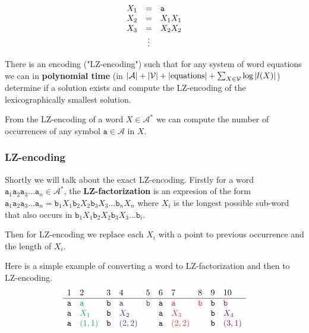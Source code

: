 $$
\begin{array}{r c l}
	X_1 &=& \mathtt{a} \\
	X_2 &=& X_1 X_1 \\
	X_3 &=& X_2 X_2 \\
	&\vdots&
\end{array}
$$

\begin{fact}
	There is an encoding ("LZ-encoding") such that for any system of word equations we can in \textbf{polynomial time} (in $\left|{\mathcal{A}}\right| + \left|{\mathcal{V}}\right| + \left|{\text{equations}}\right| + \sum_{X \in \mathcal{V}} \log |l(X)|$) determine if a solution exists and compute the LZ-encoding of the lexicographically smallest solution.
\end{fact}

\begin{fact}
	From the LZ-encoding of a word $X \in \mathcal{A}^{\ast}$ we can compute the number of occurrences of any symbol $\mathtt{a} \in \mathcal{A}$ in $X$.
\end{fact}

\subsubsection{LZ-encoding}

Shortly we will talk about the exact LZ-encoding. Firstly for a word $\mathtt{a}_1 \mathtt{a}_2 \mathtt{a}_3 \dots \mathtt{a}_n \in \mathcal{A}^\ast$, the \textbf{LZ-factorization} is an expresion of the form $\mathtt{a}_1 \mathtt{a}_2 \mathtt{a}_3 \dots \mathtt{a}_{n} = \mathtt{b}_1 X_1 \mathtt{b}_2 X_2 \mathtt{b}_3 X_3 \dots \mathtt{b}_n X_n$ where $X_i$ is the longest possible sub-word that also occurs in $\mathtt{b}_1 X_1 \mathtt{b}_2 X_2 \mathtt{b}_3 X_3 \dots \mathtt{b}_i$.

Then for LZ-encoding we replace each $X_i$ with a point to previous occurrence and the length of $X_i$.

\begin{example}
	Here is a simple example of converting a word to LZ-factorization and then to LZ-encoding.
	$$
	\begin{array}{l l l l l l l l l l}
		1 & 2 & 3 & 4 & 5 & 6 & 7 & 8 & 9 & 10 \\
		\hline
		\mathtt{a}&\textcolor{Green}{\mathtt{a}}&\mathtt{b}&\textcolor{Blue}{\mathtt{a}}&\textcolor{Blue}{\mathtt{b}}&\mathtt{a}&\textcolor{Red}{\mathtt{a}}&\textcolor{Red}{\mathtt{b}}&\mathtt{b}&\textcolor{violet}{\mathtt{b}}\\
		\mathtt{a}&\textcolor{Green}{X_1}       &\mathtt{b}&\textcolor{Blue}{X_2}       &                            &\mathtt{a}&\textcolor{Red}{X_3}       &                           &\mathtt{b}&\textcolor{violet}{X_4}\\
		\mathtt{a}&\textcolor{Green}{(1,1)}     &\mathtt{b}&\textcolor{Blue}{(2,2)}     &                            &\mathtt{a}&\textcolor{Red}{(2,2)}     &                           &\mathtt{b}&\textcolor{violet}{(3,1)}\\
	\end{array}
	$$
\end{example}

